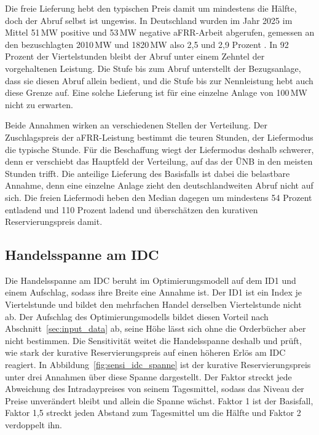 Die freie Lieferung hebt den typischen Preis damit um mindestens die Hälfte, doch der Abruf selbst ist ungewiss.
In Deutschland wurden im Jahr 2025 im Mittel 51\,\si{MW} positive und 53\,\si{MW} negative \ac{aFRR}-Arbeit abgerufen, gemessen an den bezuschlagten 2010\,\si{MW} und 1820\,\si{MW} also 2,5 und 2,9 Prozent \cite{netztransparenz_regelenergie_2026,regelleistung_ausschreibungsdaten_2026}.
In 92 Prozent der Viertelstunden bleibt der Abruf unter einem Zehntel der vorgehaltenen Leistung.
Die Stufe bis zum Abruf unterstellt der Bezugsanlage, dass sie diesen Abruf allein bedient, und die Stufe bis zur Nennleistung hebt auch diese Grenze auf.
Eine solche Lieferung ist für eine einzelne Anlage von 100\,\si{MW} nicht zu erwarten.

Beide Annahmen wirken an verschiedenen Stellen der Verteilung.
Der Zuschlagspreis der \ac{aFRR}-Leistung bestimmt die teuren Stunden, der Liefermodus die typische Stunde.
Für die Beschaffung wiegt der Liefermodus deshalb schwerer, denn er verschiebt das Hauptfeld der Verteilung, auf das der \ac{ÜNB} in den meisten Stunden trifft.
Die anteilige Lieferung des Basisfalls ist dabei die belastbare Annahme, denn eine einzelne Anlage zieht den deutschlandweiten Abruf nicht auf sich.
Die freien Liefermodi heben den Median dagegen um mindestens 54 Prozent entladend und 110 Prozent ladend und überschätzen den kurativen Reservierungspreis damit.

\subsection{Handelsspanne am \acs{IDC}}
\label{sec:sensi_idc}

Die Handelsspanne am \ac{IDC} beruht im Optimierungsmodell auf dem \ac{ID1} und einem Aufschlag, sodass ihre Breite eine Annahme ist.
Der \ac{ID1} ist ein Index je Viertelstunde und bildet den mehrfachen Handel derselben Viertelstunde nicht ab.
Der Aufschlag des Optimierungsmodells bildet diesen Vorteil nach Abschnitt~\ref{sec:input_data} ab, seine Höhe lässt sich ohne die Orderbücher aber nicht bestimmen.
Die Sensitivität weitet die Handelsspanne deshalb und prüft, wie stark der kurative Reservierungspreis auf einen höheren Erlös am \ac{IDC} reagiert.
In Abbildung~\ref{fig:sensi_idc_spanne} ist der kurative Reservierungspreis unter drei Annahmen über diese Spanne dargestellt.
Der Faktor streckt jede Abweichung des Intradaypreises von seinem Tagesmittel, sodass das Niveau der Preise unverändert bleibt und allein die Spanne wächst.
Faktor 1 ist der Basisfall, Faktor 1,5 streckt jeden Abstand zum Tagesmittel um die Hälfte und Faktor 2 verdoppelt ihn.

